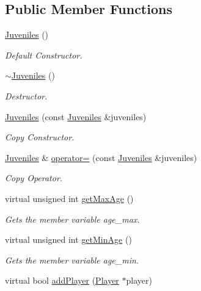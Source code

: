 \subsection*{Public Member Functions}
\begin{DoxyCompactItemize}
\item 
\hyperlink{class_juveniles_a01be3288bd98fed2069a5a4d230a6a45}{Juveniles} ()
\begin{DoxyCompactList}\small\item\em Default Constructor. \end{DoxyCompactList}\item 
\hyperlink{class_juveniles_a10fac329b43ff6a3c66f115ef61e166c}{$\sim$\+Juveniles} ()
\begin{DoxyCompactList}\small\item\em Destructor. \end{DoxyCompactList}\item 
\hyperlink{class_juveniles_a8a0e4b739295e6ec014de47125e3479f}{Juveniles} (const \hyperlink{class_juveniles}{Juveniles} \&juveniles)
\begin{DoxyCompactList}\small\item\em Copy Constructor. \end{DoxyCompactList}\item 
\hyperlink{class_juveniles}{Juveniles} \& \hyperlink{class_juveniles_ac08c2dbd72b4ffeb33de675fd4a8d411}{operator=} (const \hyperlink{class_juveniles}{Juveniles} \&juveniles)
\begin{DoxyCompactList}\small\item\em Copy Operator. \end{DoxyCompactList}\item 
virtual unsigned int \hyperlink{class_juveniles_a6b7825beb91d790fc5432902aedcc1fc}{get\+Max\+Age} ()
\begin{DoxyCompactList}\small\item\em Gets the member variable age\+\_\+max. \end{DoxyCompactList}\item 
virtual unsigned int \hyperlink{class_juveniles_a033b591527e3398a05da40e5ab954b40}{get\+Min\+Age} ()
\begin{DoxyCompactList}\small\item\em Gets the member variable age\+\_\+min. \end{DoxyCompactList}\item 
virtual bool \hyperlink{class_juveniles_a596c6380325142d8c49c8d8db7b9fa31}{add\+Player} (\hyperlink{class_player}{Player} $\ast$player)

\end{DoxyCompactItemize}
